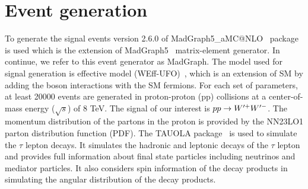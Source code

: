 \section{Event generation}\label{sec:simulation}
To generate the signal events version 2.6.0 of   MadGraph5\_aMC@NLO~\cite{Alwall:2014hca} package is used which is the extension of MadGraph5~\cite{Alwall:2011uj} matrix-element generator. In continue, we refer to this event generator  as MadGraph.
The model used for signal generation is \wprime effective model (WEff-UFO)~\cite{Sullivan:2002jt}, which  is an extension of SM by adding the \wprime boson interactions with the SM fermions.
For each set of parameters, at least 20000 events are generated in proton-proton (pp) collisions at a center-of-mass energy ($\sqrt{s}$) of 8 TeV. The signal of our interest is $ pp\rightarrow W^{\prime+} W^{\prime-}$. The momentum distribution of the partons in the proton is provided by the NN23LO1 \cite{Ball:2013hta} parton distribution function (PDF). The TAUOLA package~\cite{Davidson:2010rw} is used to simulate the $\tau$ lepton decays. It simulates the hadronic and leptonic decays of the $\tau$ lepton and provides full information about final state particles including neutrinos and mediator particles. It also considers spin information of the decay products in simulating the angular distribution of the decay products.

